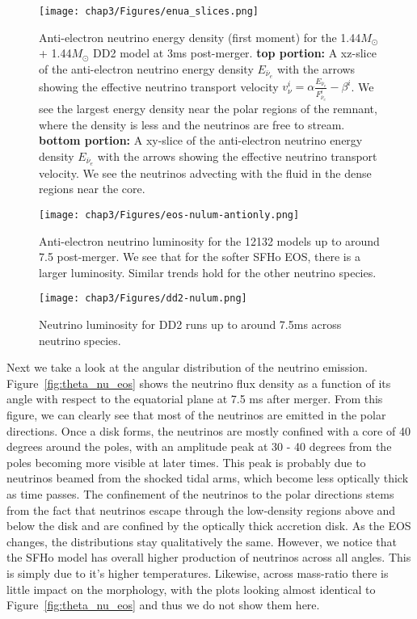 \begin{figure}[!htbp]
\texttt{[image: chap3/Figures/enua\_slices.png]}
\caption{
  Anti-electron neutrino energy density (first moment) for the 1.44$M_\odot$ + 1.44$M_\odot$ DD2 model at 3ms post-merger. \textbf{top portion:} A xz-slice of the anti-electron neutrino energy density $E_{\bar\nu_e}$ with the arrows showing the effective neutrino transport velocity $v_\nu^i = \alpha \frac{E_{\bar\nu_e}}{F^i_{\bar\nu_e}} - \beta^i$. We see the largest energy density near the polar regions of the remnant, where the density is less and the neutrinos are free to stream. \textbf{bottom portion:} A xy-slice of the anti-electron neutrino energy density $E_{\bar\nu_e}$ with the arrows showing the effective neutrino transport velocity. We see the neutrinos advecting with the fluid in the dense regions near the core.
}
  \label{fig:d144144_3ms_ENua}
\end{figure}
%

\begin{figure}[!htbp]
  \texttt{[image: chap3/Figures/eos-nulum-antionly.png]}
\caption{
  Anti-electron neutrino luminosity for the 12132 models up to around 7.5 post-merger. We see that for the softer SFHo EOS, there is a larger luminosity. Similar trends hold for the other neutrino species.
}
\label{fig:nulum_table_eos}
\end{figure}


\begin{figure*}[!htbp]
  \texttt{[image: chap3/Figures/dd2-nulum.png]}
\caption{
  Neutrino luminosity for DD2 runs up to around 7.5ms across neutrino species.
}
\label{fig:nulum_table_dd2}
\end{figure*}

Next we take a look at the angular distribution of the neutrino emission. Figure~\ref{fig:theta_nu_eos} shows the neutrino flux density as a function of its angle with respect to the equatorial plane at 7.5 ms after merger. From this figure, we can clearly see that most of the neutrinos are emitted in the polar directions. Once a disk forms, the neutrinos are mostly confined with a core of 40 degrees around the poles, with an amplitude peak at 30 - 40 degrees from the poles becoming more visible at later times. This peak is probably due to neutrinos beamed from the shocked tidal arms, which become less optically thick as time passes. The confinement of the neutrinos to the polar directions stems from the fact that neutrinos escape through the low-density regions above and below the disk and are confined by the optically thick accretion disk. As the EOS changes, the distributions stay qualitatively the same. However, we notice that the SFHo model has overall higher production of neutrinos across all angles. This is simply due to it's higher temperatures.
Likewise, across mass-ratio there is little impact on the morphology, with the plots looking almost identical to Figure~\ref{fig:theta_nu_eos} and thus we do not show them here.

